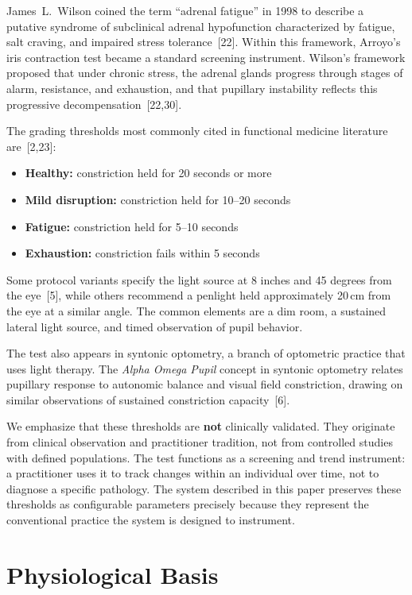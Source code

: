 \documentclass[11pt]{article}
\begin{document}
James~L.\ Wilson coined the term ``adrenal fatigue'' in 1998 to describe a
putative syndrome of subclinical adrenal hypofunction characterized by
fatigue, salt craving, and impaired stress tolerance~[22]. Within this
framework, Arroyo's iris contraction test became a standard screening
instrument. Wilson's framework proposed that under chronic stress, the
adrenal glands progress through stages of alarm, resistance, and exhaustion,
and that pupillary instability reflects this progressive
decompensation~[22,30].

The grading thresholds most commonly cited in functional medicine literature
are~[2,23]:

\begin{itemize}
  \item \textbf{Healthy:} constriction held for 20 seconds or more
  \item \textbf{Mild disruption:} constriction held for 10--20 seconds
  \item \textbf{Fatigue:} constriction held for 5--10 seconds
  \item \textbf{Exhaustion:} constriction fails within 5 seconds
\end{itemize}

Some protocol variants specify the light source at 8 inches and 45 degrees
from the eye~[5], while others recommend a penlight held approximately 20\,cm
from the eye at a similar angle. The common elements are a dim room, a
sustained lateral light source, and timed observation of pupil behavior.

The test also appears in syntonic optometry, a branch of optometric practice
that uses light therapy. The \textit{Alpha Omega Pupil} concept in syntonic
optometry relates pupillary response to autonomic balance and visual field
constriction, drawing on similar observations of sustained constriction
capacity~[6].

We emphasize that these thresholds are \textbf{not} clinically validated.
They originate from clinical observation and practitioner tradition, not from
controlled studies with defined populations. The test functions as a
screening and trend instrument: a practitioner uses it to track changes
within an individual over time, not to diagnose a specific pathology. The
system described in this paper preserves these thresholds as configurable
parameters precisely because they represent the conventional practice the
system is designed to instrument.

\section{Physiological Basis}
\end{document}
